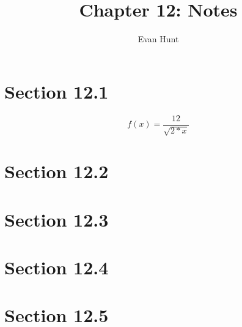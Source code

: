 \documentclass[12pt]{article}
\title{Chapter 12: Notes}
\author{Evan Hunt}
\begin{document}
    \maketitle

    \section[]{Section 12.1}
        \begin{equation}
            f(x) = \frac{12}{\sqrt{2*x}}
        \end{equation}
    \section[]{Section 12.2}
    \section[]{Section 12.3}
    \section[]{Section 12.4}
    \section[]{Section 12.5}
\end{document}
